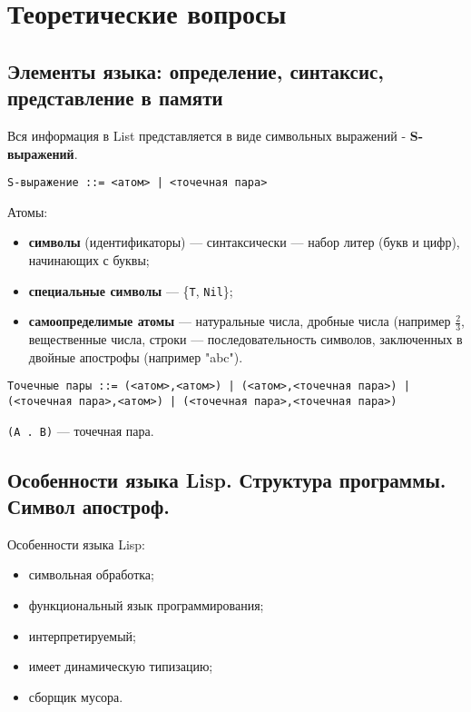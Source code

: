 \chapter{Теоретические вопросы}

    \section*{Элементы языка: определение, синтаксис, представление в памяти}

        Вся информация в List представляется в виде символьных выражений - \textbf{S-выражений}.
        
        \texttt{S-выражение ::= <атом> | <точечная пара>}

        Атомы:

        \begin{itemize}
            \item \textbf{символы} (идентификаторы) --- синтаксически --- набор литер (букв и цифр), начинающих с буквы;
            \item \textbf{специальные символы} --- \{\texttt{T}, \texttt{Nil}\};
            \item \textbf{самоопределимые атомы} --- натуральные числа, дробные числа (например \( \frac{2}{3} \), вещественные числа, строки --- последовательность символов, заключенных в двойные апострофы (например "abc").
        \end{itemize}
        
        \texttt{Точечные пары ::= (<атом>,<атом>) | (<атом>,<точечная пара>) | (<точечная пара>,<атом>) | (<точечная пара>,<точечная пара>) }
        
        \texttt{(A . B)} --- точечная пара.

    \section*{Особенности языка Lisp. Структура программы. Символ апостроф.}

        Особенности языка Lisp:
        \begin{itemize}
            \item символьная обработка;
            \item функциональный язык программирования;
            \item интерпретируемый;
            \item имеет динамическую типизацию;
            \item сборщик мусора.
        \end{itemize}
        

